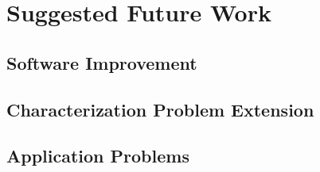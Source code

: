 \section{Suggested Future Work}
\label{sec:futurewrk}

\subsection{Software Improvement}
\label{subsec:softwareimp}

\subsection{Characterization Problem Extension}
\label{subsec:extendcharprobs}

\subsection{Application Problems}
\label{subsec:appprobs}
